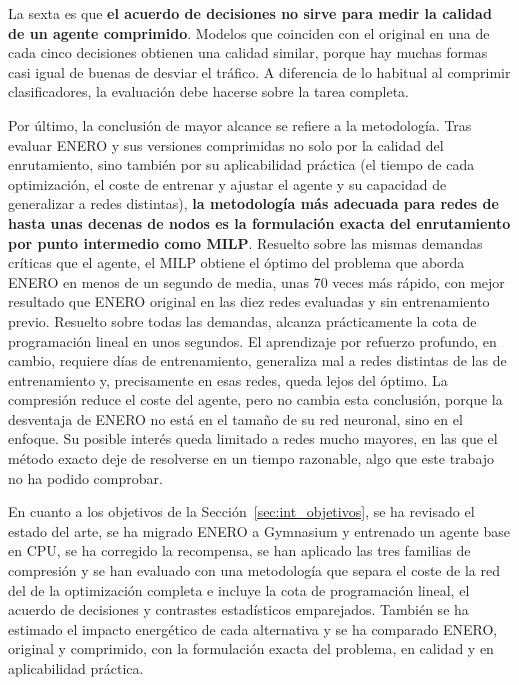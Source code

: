 La sexta es que \textbf{el acuerdo de decisiones no sirve para medir la calidad de un agente comprimido}. Modelos que coinciden con el original en una de cada cinco decisiones obtienen una calidad similar, porque hay muchas formas casi igual de buenas de desviar el tráfico. A diferencia de lo habitual al comprimir clasificadores, la evaluación debe hacerse sobre la tarea completa.

Por último, la conclusión de mayor alcance se refiere a la metodología. Tras evaluar ENERO y sus versiones comprimidas no solo por la calidad del enrutamiento, sino también por su aplicabilidad práctica (el tiempo de cada optimización, el coste de entrenar y ajustar el agente y su capacidad de generalizar a redes distintas), \textbf{la metodología más adecuada para redes de hasta unas decenas de nodos es la formulación exacta del enrutamiento por punto intermedio como MILP}. Resuelto sobre las mismas demandas críticas que el agente, el MILP obtiene el óptimo del problema que aborda ENERO en menos de un segundo de media, unas 70 veces más rápido, con mejor resultado que ENERO original en las diez redes evaluadas y sin entrenamiento previo. Resuelto sobre todas las demandas, alcanza prácticamente la cota de programación lineal en unos segundos. El aprendizaje por refuerzo profundo, en cambio, requiere días de entrenamiento, generaliza mal a redes distintas de las de entrenamiento y, precisamente en esas redes, queda lejos del óptimo. La compresión reduce el coste del agente, pero no cambia esta conclusión, porque la desventaja de ENERO no está en el tamaño de su red neuronal, sino en el enfoque. Su posible interés queda limitado a redes mucho mayores, en las que el método exacto deje de resolverse en un tiempo razonable, algo que este trabajo no ha podido comprobar.

En cuanto a los objetivos de la Sección~\ref{sec:int_objetivos}, se ha revisado el estado del arte, se ha migrado ENERO a Gymnasium y entrenado un agente base en CPU, se ha corregido la recompensa, se han aplicado las tres familias de compresión y se han evaluado con una metodología que separa el coste de la red del de la optimización completa e incluye la cota de programación lineal, el acuerdo de decisiones y contrastes estadísticos emparejados. También se ha estimado el impacto energético de cada alternativa y se ha comparado ENERO, original y comprimido, con la formulación exacta del problema, en calidad y en aplicabilidad práctica.

